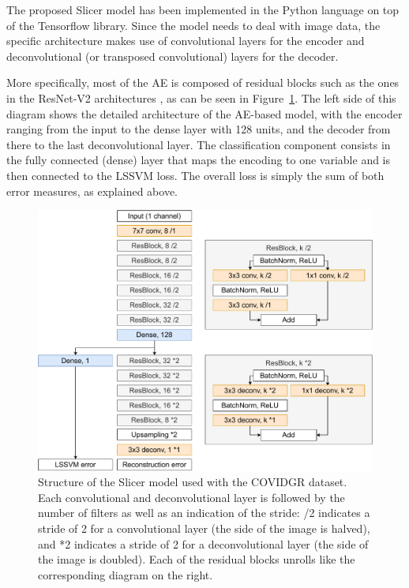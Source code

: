 \documentclass[
	fontsize=11pt, %
	twoside=false, %
	open=any, %
	secnumdepth=1, %
]{kaobook}
\begin{document}
The proposed Slicer model has been implemented in the Python language on top of the Tensorflow \cite{tensorflow2015-whitepaper} library. Since the model needs to deal with image data, the specific architecture makes use of convolutional layers for the encoder and deconvolutional (or transposed convolutional) layers for the decoder.

More specifically, most of the AE is composed of residual blocks such as the ones in the ResNet-V2 architectures \cite{he2016identity}, as can be seen in Figure~\ref{fig:architecture}. The left side of this diagram shows the detailed architecture of the AE-based model, with the encoder ranging from the input to the dense layer with 128 units, and the decoder from there to the last deconvolutional layer. The classification component consists in the fully connected (dense) layer that maps the encoding to one variable and is then connected to the LSSVM loss. The overall loss is simply the sum of both error measures, as explained above. 

\begin{figure}[htbp]
    \centering
    \includegraphics[width=.9\linewidth]{slicercovid.pdf}
    \caption{Structure of the Slicer model used with the COVIDGR dataset. Each convolutional and deconvolutional layer is followed by the number of filters as well as an indication of the stride: /2 indicates a stride of 2 for a convolutional layer (the side of the image is halved), and *2 indicates a stride of 2 for a deconvolutional layer (the side of the image is doubled). Each of the residual blocks unrolls like the corresponding diagram on the right.}
    \label{fig:architecture}
\end{figure}
\end{document}
